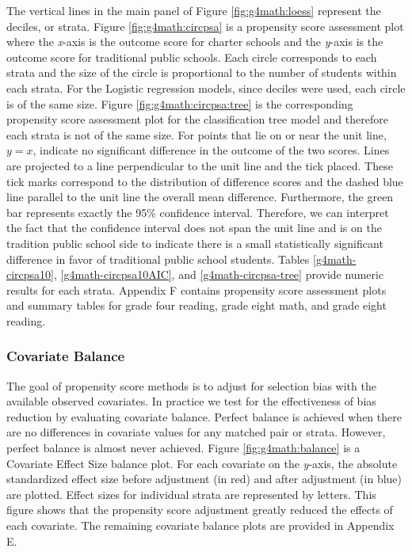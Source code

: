 \documentclass[letterpaper,12p,twoside]{article} %
\begin{document}
The vertical lines in the main panel of Figure \ref{fig:g4math:loess} represent the deciles, or strata. Figure \ref{fig:g4math:circpsa} is a propensity score assessment plot where the \textit{x}-axis is the outcome score for charter schools and the \textit{y}-axis is the outcome score for traditional public schools. Each circle corresponds to each strata and the size of the circle is proportional to the number of students within each strata. For the Logistic regression models, since deciles were used, each circle is of the same size. Figure \ref{fig:g4math:circpsa:tree} is the corresponding propensity score assessment plot for the classification tree model and therefore each strata is not of the same size. For points that lie on or near the unit line, $y = x$, indicate no significant difference in the outcome of the two scores. Lines are projected to a line perpendicular to the unit line and the tick placed. These tick marks correspond to the distribution of difference scores and the dashed blue line parallel to the unit line the overall mean difference. Furthermore, the green bar represents exactly the 95\% confidence interval. Therefore, we can interpret the fact that the confidence interval does not span the unit line and is on the tradition public school side to indicate there is a small statistically significant difference in favor of traditional public school students. Tables \ref{g4math-circpsa10}, \ref{g4math-circpsa10AIC}, and \ref{g4math-circpsa-tree} provide numeric results for each strata. Appendix F contains propensity score assessment plots and summary tables for grade four reading, grade eight math, and grade eight reading.

\subsubsection{Covariate Balance}

The goal of propensity score methods is to adjust for selection bias with the available observed covariates. In practice we test for the effectiveness of bias reduction by evaluating covariate balance. Perfect balance is achieved when there are no differences in covariate values for any matched pair or strata. However, perfect balance is almost never achieved. Figure \ref{fig:g4math:balance} is a Covariate Effect Size balance plot. For each covariate on the \textit{y}-axis, the absolute standardized effect size before adjustment (in red) and after adjustment (in blue) are plotted. Effect sizes for individual strata are represented by letters. This figure shows that the propensity score adjustment greatly reduced the effects of each covariate. The remaining covariate balance plots are provided in Appendix E.
\end{document}
